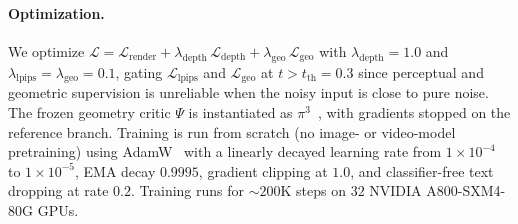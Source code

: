 \paragraph{Optimization.}
We optimize $\mathcal{L} = \mathcal{L}_{\mathrm{render}} + \lambda_{\mathrm{depth}}\,\mathcal{L}_{\mathrm{depth}} + \lambda_{\mathrm{geo}}\,\mathcal{L}_{\mathrm{geo}}$ with $\lambda_{\mathrm{depth}}{=}1.0$ and $\lambda_{\mathrm{lpips}}{=}\lambda_{\mathrm{geo}}{=}0.1$, gating $\mathcal{L}_{\mathrm{lpips}}$ and $\mathcal{L}_{\mathrm{geo}}$ at $t{>}t_{\mathrm{th}}{=}0.3$ since perceptual and geometric supervision is unreliable when the noisy input is close to pure noise. The frozen geometry critic $\Psi$ is instantiated as $\pi^3$~\citep{wang2025pi}, with gradients stopped on the reference branch. Training is run from scratch (no image- or video-model pretraining) using AdamW~\citep{loshchilov2017decoupled} with a linearly decayed learning rate from $1\!\times\!10^{-4}$ to $1\!\times\!10^{-5}$, EMA decay $0.9995$, gradient clipping at $1.0$, and classifier-free text dropping at rate $0.2$. Training runs for $\sim\!200$K steps on $32$ NVIDIA A800-SXM4-80G GPUs.